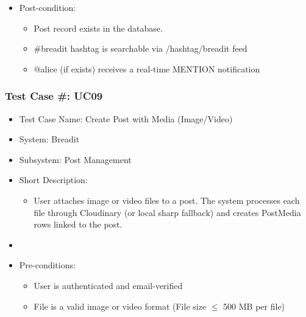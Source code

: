 \begin{itemize}
  \item Post-condition:
\begin{itemize}
  \item Post record exists in the database.
  \item \#breadit hashtag is searchable via /hashtag/breadit feed
  \item @alice (if exists) receives a real-time MENTION notification
\end{itemize}
\end{itemize}

\subsubsection{Test Case \#: UC09}
\begin{itemize}
  \item Test Case Name: Create Post with Media (Image/Video)
  \item System: Breadit
  \item Subsystem: Post Management
  \item Short Description:
\begin{itemize}
  \item User attaches image or video files to a post. The system processes each file through Cloudinary (or local sharp fallback) and creates PostMedia rows linked to the post.
\end{itemize}
  \item 
  \item Pre-conditions:
\begin{itemize}
  \item User is authenticated and email-verified
  \item File is a valid image or video format (File size $\leq$ 500 MB per file)
\end{itemize}
\end{itemize}

